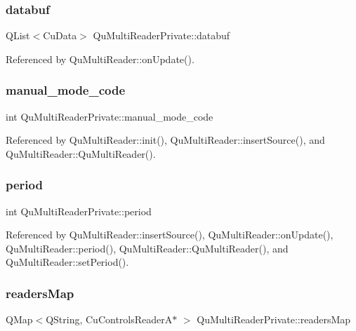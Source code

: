 \subsubsection{databuf}
{\footnotesize\ttfamily Q\+List$<$Cu\+Data$>$ Qu\+Multi\+Reader\+Private\+::databuf}



Referenced by Qu\+Multi\+Reader\+::on\+Update().

\mbox{\label{classQuMultiReaderPrivate_a99a175c723615db7a8eb5cd613821473}} 
\subsubsection{manual\_mode\_code}
{\footnotesize\ttfamily int Qu\+Multi\+Reader\+Private\+::manual\+\_\+mode\+\_\+code}



Referenced by Qu\+Multi\+Reader\+::init(), Qu\+Multi\+Reader\+::insert\+Source(), and Qu\+Multi\+Reader\+::\+Qu\+Multi\+Reader().

\mbox{\label{classQuMultiReaderPrivate_a7283f0290587d7bdc7ec515c1394a26e}} 
\subsubsection{period}
{\footnotesize\ttfamily int Qu\+Multi\+Reader\+Private\+::period}



Referenced by Qu\+Multi\+Reader\+::insert\+Source(), Qu\+Multi\+Reader\+::on\+Update(), Qu\+Multi\+Reader\+::period(), Qu\+Multi\+Reader\+::\+Qu\+Multi\+Reader(), and Qu\+Multi\+Reader\+::set\+Period().

\mbox{\label{classQuMultiReaderPrivate_a324a4df4eb37cb113935c75705baedd8}} 
\subsubsection{readersMap}
{\footnotesize\ttfamily Q\+Map$<$Q\+String, Cu\+Controls\+ReaderA$\ast$ $>$ Qu\+Multi\+Reader\+Private\+::readers\+Map}



